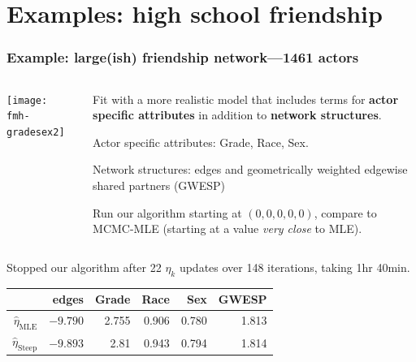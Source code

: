 \documentclass[ 10pt]{beamer}
\newcommand{\etaMLE}{\hat{\eta}_{\textrm{MLE}}}
\begin{document}
\section{Examples: high school friendship}

\frame
{
  \frametitle{Example: large(ish) friendship network---1461 actors}  
\begin{columns}[t]
\begin{column}[T]{0.3\textwidth}
\texttt{[image: fmh-gradesex2]}
\end{column}

\begin{column}[T]{0.7\textwidth}
Fit with a more realistic model that includes terms for \textbf{actor 
specific attributes} in addition to \textbf{network structures}.  
\vspace{1mm}

Actor specific attributes: Grade, Race, Sex.
\vspace{2mm}

Network structures: edges and geometrically weighted edgewise shared partners (GWESP)
\vspace{5mm}
\pause

Run our algorithm starting at $(0,0,0,0,0)$, compare to MCMC-MLE (starting at a value \emph{very close} to MLE).
\end{column}
\end{columns}
\vspace{10mm}

\pause
Stopped our algorithm after 22 $\eta_k$ updates over 148 iterations, taking 1hr 40min.
\begin{table}
\begin{center} 

\begin{tabular}{rrrrrr}
  \hline
 & edges & Grade & Race & Sex & GWESP \\ 
  \hline
$\etaMLE$ & $-9.790$ & 2.755 & 0.906 & 0.780 & 1.813 \\ 
$\hat{\eta}_{\textrm{Steep}}$ & 	$-9.893$	&	2.81	&	0.943	&	0.794	&	1.814\\ 
   \hline
\end{tabular}\label{T:FauxMagnolia}
\end{center}
\end{table}


}
\end{document}
